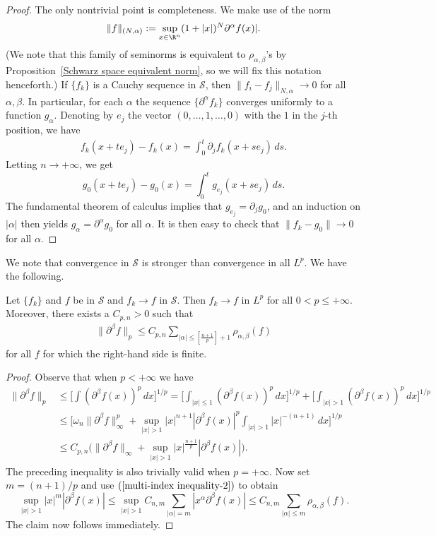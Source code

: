 \begin{proof}
The only nontrivial point is completeness. We make use of the norm
\[\|f\|_{(N,\alpha)}:=\sup_{x\in\R^n}(1+|x|)^{N}\partial^\alpha f(x)|.\]
(We note that this family of seminorms is equivalent to $\rho_{\alpha,\beta}$'s by Proposition~\ref{Schwarz space equivalent norm}, so we will fix this notation henceforth.) If $\{f_k\}$ is a Cauchy sequence in $\mathscr{S}$, then $\|f_i-f_j\|_{N,\alpha}\to 0$ for all $\alpha,\beta$. In particular, for each $\alpha$ the sequence $\{\partial^\alpha f_k\}$ converges uniformly to a function $g_\alpha$. Denoting by $e_j$ the vector $(0,\dots,1,\dots,0)$ with the $1$ in the $j$-th position, we have
\begin{align*}
f_k(x+te_j)-f_k(x)=\int_{0}^{t}\partial_jf_k(x+se_j)\,ds.
\end{align*}
Letting $n\to+\infty$, we get
\[g_0(x+te_j)-g_0(x)=\int_{0}^{t}g_{e_j}(x+se_j)\,ds.\]
The fundamental theorem of calculus implies that $g_{e_j}=\partial_jg_0$, and an induction on $|\alpha|$ then yields $g_\alpha=\partial^\alpha g_0$ for all $\alpha$. It is then easy to check that $\|f_k-g_0\|\to 0$ for all $\alpha$.
\end{proof}
We note that convergence in $\mathscr{S}$ is stronger than convergence in all $L^p$. We have the following.
\begin{proposition}\label{Schwarz converge stronger than L^p}
Let $\{f_k\}$ and $f$ be in $\mathscr{S}$ and $f_k\to f$ in $\mathscr{S}$. Then $f_k\to f$ in $L^p$ for all $0<p\leq+\infty$. Moreover, there exists a $C_{p,n}>0$ such that
\begin{align}\label{Schwarz converge stronger than L^p-1}
\|\partial^\beta f\|_{p}\leq C_{p,n}\sum_{|\alpha|\leq[\frac{n+1}{p}]+1}\rho_{\alpha,\beta}(f)
\end{align}
for all $f$ for which the right-hand side is finite.
\end{proposition}
\begin{proof}
Observe that when $p<+\infty$ we have
\begin{align*}
\|\partial^\beta f\|_{p}&\leq\Big[\int(\partial^\beta f(x))^p\,dx\Big]^{1/p}=\Big[\int_{|x|\leq 1}(\partial^\beta f(x))^p\,dx\Big]^{1/p}+\Big[\int_{|x|>1}(\partial^\beta f(x))^p\,dx\Big]^{1/p}\\
&\leq\Big[\omega_n\|\partial^\beta f\|_{\infty}^p+\sup_{|x|>1}|x|^{n+1}|\partial^\beta f(x)|^p\int_{|x|>1}|x|^{-(n+1)}\,dx\Big]^{1/p}\\
&\leq C_{p,n}\Big(\|\partial^\beta f\|_{\infty}+\sup_{|x|>1}|x|^{\frac{n+1}{p}}|\partial^\beta f(x)|\Big).
\end{align*}
The preceding inequality is also trivially valid when $p=+\infty$. Now set $m=(n+1)/p$ and use $(\ref{multi-index inequality-2})$ to obtain
\[\sup_{|x|>1}|x|^{m}|\partial^\beta f(x)|\leq\sup_{|x|>1}C_{n,m}\sum_{|\alpha|=m}|x^\alpha\partial^\beta f(x)|\leq C_{n,m}\sum_{|\alpha|\leq m}\rho_{\alpha,\beta}(f).\]
The claim now follows immediately.
\end{proof}
